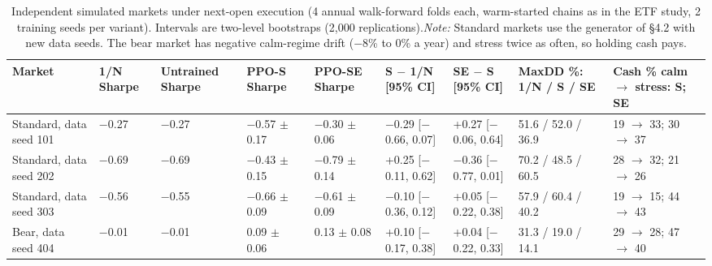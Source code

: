 \documentclass[11pt]{article}
\begin{document}
\begin{table}[!htbp]
\centering\scriptsize
\caption{Independent simulated markets under next-open execution (4 annual walk-forward folds each, warm-started chains as in the ETF study, 2 training seeds per variant). Intervals are two-level bootstraps (2,000 replications).\label{tab-synrob-sm} \emph{Note:} Standard markets use the generator of \S{}4.2 with new data seeds. The bear market has negative calm-regime drift ($-$8\% to 0\% a year) and stress twice as often, so holding cash pays.}
\begin{adjustbox}{max width=\linewidth}
\begin{tabular}{@{}lllllllll@{}}
\toprule
Market & 1/N Sharpe & Untrained Sharpe & PPO-S Sharpe & PPO-SE Sharpe & S $-$ 1/N {[}95\% CI{]} & SE $-$ S {[}95\% CI{]} & MaxDD \%: 1/N / S / SE & Cash \% calm $\to$ stress: S; SE \\
\midrule
Standard, data seed 101 & $-$0.27 & $-$0.27 & $-$0.57{ $\pm$ 0.17} & $-$0.30{ $\pm$ 0.06} & $-$0.29 {[}$-$0.66, 0.07{]} & +0.27 {[}$-$0.06, 0.64{]} & 51.6 / 52.0 / 36.9 & 19 $\to$ 33; 30 $\to$ 37 \\
Standard, data seed 202 & $-$0.69 & $-$0.69 & $-$0.43{ $\pm$ 0.15} & $-$0.79{ $\pm$ 0.14} & +0.25 {[}$-$0.11, 0.62{]} & $-$0.36 {[}$-$0.77, 0.01{]} & 70.2 / 48.5 / 60.5 & 28 $\to$ 32; 21 $\to$ 26 \\
Standard, data seed 303 & $-$0.56 & $-$0.55 & $-$0.66{ $\pm$ 0.09} & $-$0.61{ $\pm$ 0.09} & $-$0.10 {[}$-$0.36, 0.12{]} & +0.05 {[}$-$0.22, 0.38{]} & 57.9 / 60.4 / 40.2 & 19 $\to$ 15; 44 $\to$ 43 \\
Bear, data seed 404 & $-$0.01 & $-$0.01 & 0.09{ $\pm$ 0.06} & 0.13{ $\pm$ 0.08} & +0.10 {[}$-$0.17, 0.38{]} & +0.04 {[}$-$0.22, 0.33{]} & 31.3 / 19.0 / 14.1 & 29 $\to$ 28; 47 $\to$ 40 \\
\bottomrule
\end{tabular}
\end{adjustbox}
\end{table}
\end{document}
